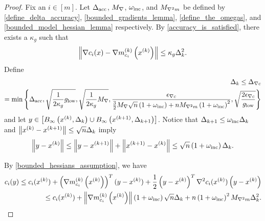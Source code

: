 \begin{proof}
Fix an $i \in [m]$.
Let
${\Delta_{\textrm{acc}}}$,
${M_{\nabla}}$,
$\omega_{\text{inc}}$, 
and ${M_{\nabla^2 m}}$
be defined by
\cref{define_delta_accuracy},
\cref{bounded_gradients_lemma},
\cref{define_the_omegas},
and \cref{bounded_model_hessian_lemma}
respectively.
By \cref{accuracy_is_satisfied}, there exists a $\kappa_g$ such that
\begin{align}
\label{oszm_accuracy}
\left\|\nabla c_i(x) - {\nabla m_{c_i}^{(k)}\left(x^{(k)}\right)}\right\| \le \kappa_g \Delta_k^2.
\end{align}
Define
\begin{align}
\Delta_k \le {\Delta_{\nabla c}} \nonumber \\= \min\left\{
{\Delta_{\textrm{acc}}},
\sqrt{\frac 1 {2\kappa_g} { g_{\textrm{low}} }},
\sqrt{\frac 1 {2\kappa_g} {M_{\nabla}}},
\frac{{\epsilon_{\nabla c}}}{\frac 3 2 {M_{\nabla}}\sqrt{n}\left(1 + \omega_{\text{inc}}\right) + n {M_{\nabla^2 m}} \left(1 + \omega_{\text{inc}}\right)^2},
\sqrt{\frac{2{\epsilon_{\nabla c}}}{{ g_{\textrm{low}} }}}
\right\} \label{define_mingraddelta}
\end{align}
and let $y\in \left[{ B_{\infty}\left(x^{(k)}, \Delta_k\right) } \cup { B_{\infty}\left({{x}^{(k+1)}}, \Delta_{k+1}\right) }\right]$.
Notice that $\Delta_{k+1} \le \omega_{\text{inc}} \Delta_k$ and $\left\|x^{(k)} - {{x}^{(k+1)}}\right\| \le \sqrt{n}\Delta_k$ imply
\begin{align*}
\left\|y - x^{(k)}\right\| \le \left\|y - {{x}^{(k+1)}}\right\| + \left\|{{x}^{(k+1)}} - x^{(k)}\right\| \le \sqrt{n}\left(1 + \omega_{\text{inc}}\right)\Delta_k.
\end{align*}

By \cref{bounded_hessians_assumption}, we have
\begin{align}
c_i(y) \le c_i(x^{(k)}) + \left({\nabla m_{c_i}^{(k)}\left(x^{(k)}\right)}\right)^T(y - x^{(k)}) + \frac 1 2 \left(y - x^{(k)}\right)^T\nabla^2{c_i}(x^{(k)})\left(y - x^{(k)}\right) \nonumber \\
\le c_i(x^{(k)}) + \left\|{\nabla m_{c_i}^{(k)}\left(x^{(k)}\right)}\right\|\left(1 + \omega_{\text{inc}}\right) \sqrt{n}\Delta_k +n \left(1 + \omega_{\text{inc}}\right)^2{M_{\nabla^2 m}}\Delta_k^2.
\label{oszm_first_bound}
\end{align}


\end{proof}
